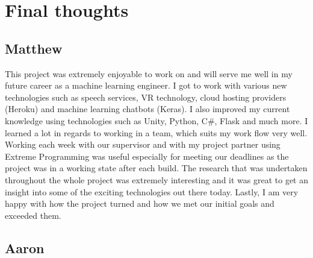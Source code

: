 \section{Final thoughts}
\subsection{Matthew}
This project was extremely enjoyable to work on and will serve me well in my future career as a machine learning engineer. I got to work with various new technologies such as speech services, VR technology, cloud hosting providers (Heroku) and machine learning chatbots (Keras). I also improved my current knowledge using technologies such as Unity, Python, C\#, Flask and much more. I learned a lot in regards to working in a team, which suits my work flow very well. Working each week with our supervisor and with my project partner using Extreme Programming was useful especially for meeting our deadlines as the project was in a working state after each build. The research that was undertaken throughout the whole project was extremely interesting and it was great to get an insight into some of the exciting technologies out there today. Lastly, I am very happy with how the project turned and how we met our initial goals and exceeded them.

\subsection{Aaron}